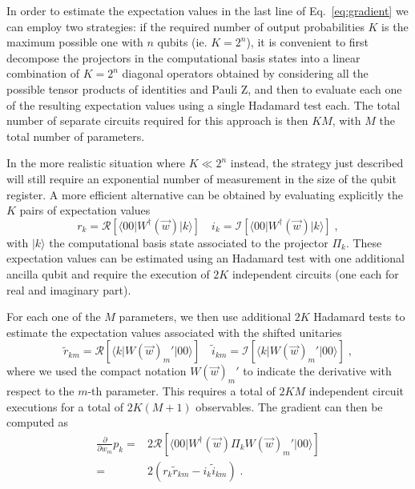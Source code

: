 In order to estimate the expectation values in the last line of Eq.~\eqref{eq:gradient} we can employ two strategies: if the required number of output probabilities $K$ is the maximum possible one with $n$ qubits (ie. $K=2^n$), it is convenient to first decompose the projectors in the computational basis states into a linear combination of $K=2^n$ diagonal operators obtained by considering all the possible tensor products of identities and Pauli Z, and then to evaluate each one of the resulting expectation values using a single Hadamard test each. The total number of separate circuits required for this approach is then $KM$, with $M$ the total number of parameters.

In the more realistic situation where $K\ll2^n$ instead, the strategy just described will still require an exponential number of measurement in the size of the qubit register. A more efficient alternative can be obtained by evaluating explicitly the $K$ pairs of expectation values
\begin{equation}
r_k = \mathcal{R} \left[\langle 00 \lvert W^\dagger(\vec{w}) \rvert k\rangle\right]\quad i_k = \mathcal{I} \left[\langle 00 \lvert W^\dagger(\vec{w}) \rvert k\rangle\right]\;,
\end{equation}
with $\rvert k\rangle$ the computational basis state associated to the projector $\Pi_k$. These expectation values can be estimated using an Hadamard test with one additional ancilla qubit and require the execution of $2K$ independent circuits (one each for real and imaginary part).

For each one of the $M$ parameters, we then use additional $2K$ Hadamard tests to estimate the expectation values associated with the shifted unitaries
\begin{equation}
\widetilde{r}_{km} = \mathcal{R} \left[\langle k \lvert W(\vec{w})_m' \rvert 00\rangle\right]\quad \widetilde{i}_{km} = \mathcal{I} \left[\langle k \lvert W(\vec{w})_m' \rvert 00\rangle\right]\;,
\end{equation}
where we used the compact notation $W(\vec{w})_m'$ to indicate the derivative with respect to the $m$-th parameter.
This requires a total of $2KM$ independent circuit executions for a total of $2K(M+1)$ observables. The gradient can then be computed as
\begin{equation}
\begin{split}
\label{eq:gradient_Htest}
\frac{\partial}{\partial w_m} p_k =&2\mathcal{R}\left[\langle00\lvert W^\dagger(\vec{w})\Pi_kW(\vec{w})_m'\rvert00\rangle\right]\\
=&2\left(r_k\widetilde{r}_{km}- i_k\widetilde{i}_{km}\right)\;.
\end{split}
\end{equation}

